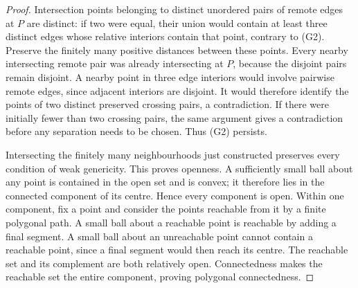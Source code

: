 \begin{proof}
Intersection points belonging to distinct unordered pairs of remote edges at $P$ are
distinct: if two were equal, their union would contain at least three
distinct edges whose relative interiors contain that point, contrary
to (G2). Preserve the finitely many positive distances between these
points. Every nearby intersecting remote pair was already intersecting
at $P$, because the disjoint pairs remain disjoint. A nearby point in
three edge interiors would involve pairwise remote edges, since
adjacent interiors are disjoint. It would therefore identify the
points of two distinct preserved crossing pairs, a contradiction.
If there were initially fewer than two crossing pairs, the same
argument gives a contradiction before any separation needs to be
chosen. Thus (G2) persists.

Intersecting the finitely many neighbourhoods just constructed
preserves every condition of weak genericity. This proves openness.
A sufficiently small ball about any point is contained in the open
set and is convex; it therefore lies in the connected component of
its centre. Hence every component is open. Within one component,
fix a point and consider the points reachable from it by a finite
polygonal path. A small ball about a reachable point is reachable
by adding a final segment. A small ball about an unreachable point
cannot contain a reachable point, since a final segment would then
reach its centre. The reachable set and its complement are both
relatively open. Connectedness makes the reachable set the entire
component, proving polygonal connectedness.
\end{proof}

